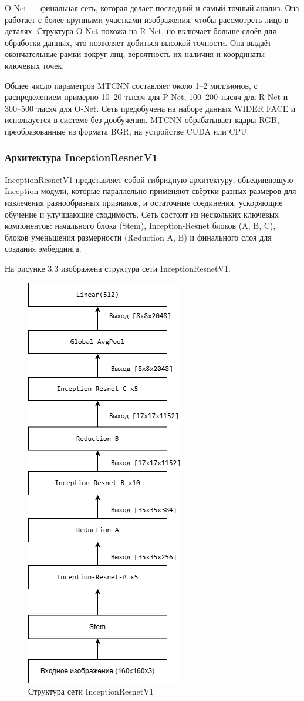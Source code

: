 O-Net — финальная сеть, которая делает последний и самый точный анализ. Она работает с более крупными участками изображения, чтобы рассмотреть лицо в деталях. Структура O-Net похожа на R-Net, но включает больше слоёв для обработки данных, что позволяет добиться высокой точности. Она выдаёт окончательные рамки вокруг лиц, вероятность их наличия и координаты ключевых точек.

Общее число параметров MTCNN составляет около 1–2 миллионов, с распределением примерно 10–20 тысяч для P-Net, 100–200 тысяч для R-Net и 300–500 тысяч для O-Net. Сеть предобучена на наборе данных WIDER FACE и используется в системе без дообучения. MTCNN обрабатывает кадры RGB, преобразованные из формата BGR, на устройстве CUDA или CPU.

\subsubsection{Архитектура InceptionResnetV1}

InceptionResnetV1 представляет собой гибридную архитектуру, объединяющую Inception-модули, которые параллельно применяют свёртки разных размеров для извлечения разнообразных признаков, и остаточные соединения, ускоряющие обучение и улучшающие сходимость. Сеть состоит из нескольких ключевых компонентов: начального блока (Stem), Inception-Resnet блоков (A, B, C), блоков уменьшения размерности (Reduction A, B) и финального слоя для создания эмбеддинга. 

На рисунке 3.3 изображена структура сети InceptionResnetV1.

\begin{figure}[H]
	\centering
	\includegraphics[width=0.3\linewidth]{images/inceptionresnetv1}
	\caption{Структура сети InceptionResnetV1}
	\label{fig:inceptionresnetv1}
\end{figure}


